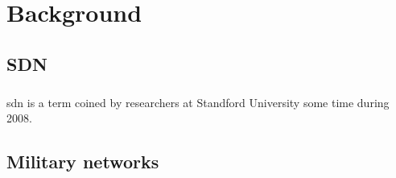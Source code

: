 \chapter{Background}
\label{ch:background}
\section{SDN}
\paragraph{} \gls{sdn} is a term coined by researchers at Standford University some time during 2008.
\section{Military networks}